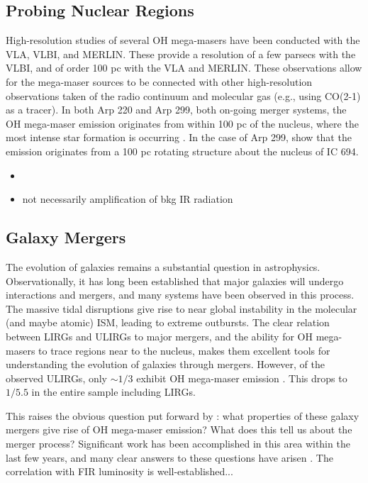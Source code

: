 \subsection{Probing Nuclear Regions}
\label{sub:oh_highres}

High-resolution studies of several OH mega-masers have been conducted with the VLA, VLBI, and MERLIN. These provide a resolution of a few parsecs with the VLBI, and of order 100 pc with the VLA and MERLIN. These observations allow for the mega-maser sources to be connected with other high-resolution observations taken of the radio continuum and molecular gas (e.g., using CO(2-1) as a tracer). In both Arp 220 and Arp 299, both on-going merger systems, the OH mega-maser emission originates from within 100 pc of the nucleus, where the most intense star formation is occurring \citet{Lonsdale_1994, Baan_1990}. In the case of Arp 299, \citet{Baan_1990} show that the emission originates from a 100 pc rotating structure about the nucleus of IC 694.

\begin{itemize}
\item 
\item not necessarily amplification of bkg IR radiation
\end{itemize}

\subsection{Galaxy Mergers}
\label{sub:oh_mergers}

The evolution of galaxies remains a substantial question in astrophysics. Observationally, it has long been established that major galaxies will undergo interactions and mergers, and many systems have been observed in this process. The massive tidal disruptions give rise to near global instability in the molecular (and maybe atomic) ISM, leading to extreme outbursts. The clear relation between LIRGs and ULIRGs to major mergers, and the ability for OH mega-masers to trace regions near to the nucleus, makes them excellent tools for understanding the evolution of galaxies through mergers. However, of the observed ULIRGs, only $\sim 1/3$ exhibit OH mega-maser emission \citep{darling2002_paperIII}. This drops to $1/5.5$ in the entire sample including LIRGs.



This raises the obvious question put forward by \citet{lo2005}: what properties of these galaxy mergers give rise of OH mega-maser emission? What does this tell us about the merger process? Significant work has been accomplished in this area within the last few years, and many clear answers to these questions have arisen \citep{darling2012}. The correlation with FIR luminosity is well-established... 


